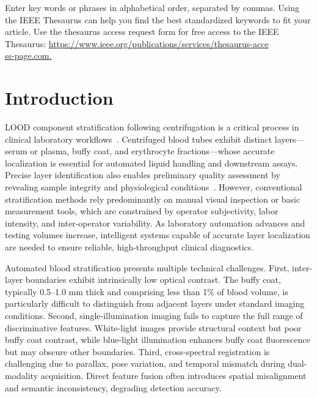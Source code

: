 \documentclass[journal,twoside,web]{ieeecolor}
\begin{document}
\begin{IEEEkeywords}
Enter key words or phrases in alphabetical order, separated by commas. Using the IEEE Thesaurus can help you find the best standardized keywords to fit your article. Use the thesaurus access request form for free access to the IEEE Thesaurus: \underline{https://www.ieee.org/publications/services/thesaurus-acce}\\
\underline{ss-page.com.}
\end{IEEEkeywords}

\section{Introduction}
\label{sec:introduction}
LOOD component stratification following centrifugation is a critical process in clinical laboratory workflows~\cite{blood}. Centrifuged blood tubes exhibit distinct layers—serum or plasma, buffy coat, and erythrocyte fractions—whose accurate localization is essential for automated liquid handling and downstream assays. Precise layer identification also enables preliminary quality assessment by revealing sample integrity and physiological conditions~\cite{automation}. However, conventional stratification methods rely predominantly on manual visual inspection or basic measurement tools, which are constrained by operator subjectivity, labor intensity, and inter-operator variability. As laboratory automation advances and testing volumes increase, intelligent systems capable of accurate layer localization are needed to ensure reliable, high-throughput clinical diagnostics.

Automated blood stratification presents multiple technical challenges. First, inter-layer boundaries exhibit intrinsically low optical contrast. The buffy coat, typically 0.5–1.0 mm thick and comprising less than 1\% of blood volume, is particularly difficult to distinguish from adjacent layers under standard imaging conditions. Second, single-illumination imaging fails to capture the full range of discriminative features. White-light images provide structural context but poor buffy coat contrast, while blue-light illumination enhances buffy coat fluorescence but may obscure other boundaries. Third, cross-spectral registration is challenging due to parallax, pose variation, and temporal mismatch during dual-modality acquisition. Direct feature fusion often introduces spatial misalignment and semantic inconsistency, degrading detection accuracy.
\end{document}
